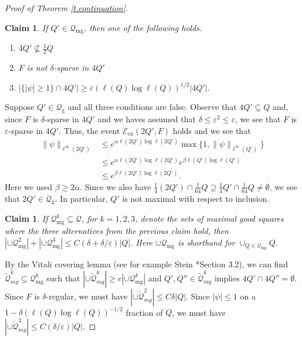 \documentclass{amsart}
\newtheorem{claim}[equation]{Claim}
\newcommand{\tref}[1]{Theorem \ref{t.#1}}
\numberwithin{equation}{section}
\numberwithin{figure}{section}
\newcommand{\ep}{\varepsilon}
\begin{document}
\begin{proof}[Proof of \tref{continuation}]
\begin{claim}
\label{cl.alternatives}
If $Q' \in \mathcal Q_{\mathrm{mg}}$, then one of the following holds.
\begin{enumerate}
\item $4Q' \nsubseteq \tfrac12 Q$
\item $F$ is not $\delta$-sparse in $4Q'$
\item $|\{ |\psi| \geq 1 \} \cap 4Q'| \geq \ep (\ell(Q) \log \ell(Q))^{1/2} |4Q'|.$
\end{enumerate}
\end{claim}

Suppose $Q' \in \mathcal Q_{\mathrm{g}}$ and all three conditions are false.  Observe that $4 Q' \subseteq Q$ and, since $F$ is $\delta$-sparse in $4 Q'$ and we haves assumed that $\delta \leq \ep^2 \leq \ep$, we see that $F$ is $\ep$-sparse in $4 Q'$. Thus, the event $\mathcal E_{\mathrm{ex}}(2Q',F)$ holds and we see that
\begin{equation*}
\begin{aligned}
\| \psi \|_{\ell^\infty(2Q')}
& \leq e^{\alpha \ell(2Q') \log \ell(2Q')} \max \{ 1, \| \psi \|_{\ell^\infty(Q')} \} \\
& \leq e^{\alpha \ell(2Q') \log \ell(2Q')} e^{\beta \ell(Q') \log \ell(Q')} \\
& \leq e^{\beta \ell(2Q') \log \ell(2Q')}.
\end{aligned}
\end{equation*}
Here we used $\beta \geq 2 \alpha$.  Since we also have $\tfrac14 (2Q') \cap \tfrac{1}{64} Q \supseteq \tfrac14 Q' \cap \tfrac{1}{64} Q \neq \emptyset$, we see that $2Q' \in \mathcal Q_{\mathrm{g}}$.  In particular, $Q'$ is not maximal with respect to inclusion.

\begin{claim}
\label{cl.alternatives23small}
If $\mathcal Q_{\mathrm{mg}}^k \subseteq \mathcal Q$, for $k = 1, 2, 3$, denote the sets of maximal good squares where the three alternatives from the previous claim hold, then $|\cup \mathcal Q_{\mathrm{mg}}^2| + |\cup \mathcal Q_{\mathrm{mg}}^3| \leq C (\delta + \delta/\ep) |Q|$.  Here $\cup \mathcal Q_{\mathrm{mg}}$ is shorthand for $\cup_{Q \in \mathcal Q_{\mathrm{mg}}} Q$.
\end{claim}

By the Vitali covering lemma (see for example Stein \cite{Stein}*{Section 3.2}), we can find $\tilde {\mathcal Q}_{mg}^k \subseteq \mathcal Q_{\mathrm{mg}}^k$ such that $|\cup \tilde {\mathcal Q}_{mg}^k| \geq c |\cup \mathcal Q_{\mathrm{mg}}^k|$ and $Q', Q'' \in \tilde {\mathcal Q}_{mg}^k$ implies $4 Q' \cap 4 Q'' = \emptyset$.  Since $F$ is $\delta$-regular, we must have $|\cup \tilde {\mathcal Q}_{mg}^2| \leq C \delta |Q|$.  Since $|\psi| \leq 1$ on a $1-\delta (\ell(Q) \log \ell(Q))^{-1/2}$ fraction of $Q$, we must have $|\cup \tilde {\mathcal Q}_{mg}^3| \leq C (\delta/\ep) |Q|$.


\end{proof}
\end{document}
